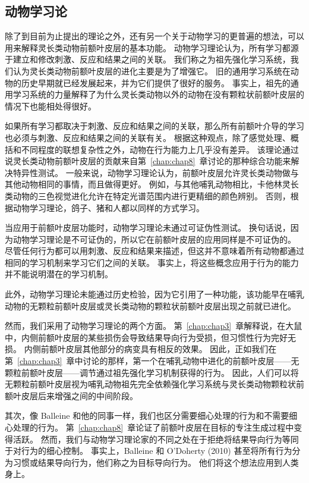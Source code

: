 \subsection{动物学习论}
除了到目前为止提出的理论之外，还有另一个关于动物学习的更普遍的想法，可以用来解释灵长类动物前额叶皮层的基本功能。 动物学习理论认为，所有学习都源于建立和修改刺激、反应和结果之间的关联。 我们称之为祖先强化学习系统，我们认为灵长类动物前额叶皮层的进化主要是为了增强它。 旧的通用学习系统在动物的历史早期就已经发展起来，并为它们提供了很好的服务。 事实上，祖先的通用学习系统的力量解释了为什么灵长类动物以外的动物在没有颗粒状前额叶皮层的情况下也能相处得很好。
\par 
如果所有学习都取决于刺激、反应和结果之间的关联，那么所有前额叶介导的学习也必须与刺激、反应和结果之间的关联有关。 根据这种观点，除了感觉处理、概括和不同程度的联想复杂性之外，动物在行为能力上几乎没有差异。 该理论通过说灵长类动物前额叶皮层的贡献来自第~\ref{chap:chap8}~章讨论的那种综合功能来解决特异性测试。 一般来说，动物学习理论认为，前额叶皮层允许灵长类动物做与其他动物相同的事情，而且做得更好。 例如，与其他哺乳动物相比，卡他林灵长类动物的三色视觉进化允许在特定光谱范围内进行更精细的颜色辨别。 否则，根据动物学习理论，鸽子、猪和人都以同样的方式学习。
\par 
当应用于前额叶皮层功能时，动物学习理论未通过可证伪性测试。 换句话说，因为动物学习理论是不可证伪的，所以它在前额叶皮层的应用同样是不可证伪的。 尽管任何行为都可以用刺激、反应和结果来描述，但这并不意味着所有动物都通过相同的学习机制来学习它们之间的关联。 事实上，将这些概念应用于行为的能力并不能说明潜在的学习机制。
\par 
此外，动物学习理论未能通过历史检验，因为它引用了一种功能，该功能早在哺乳动物的无颗粒前额叶皮层或灵长类动物的颗粒状前额叶皮层出现之前就已进化。
\par 
然而，我们采用了动物学习理论的两个方面。 第~\ref{chap:chap3}~章解释说，在大鼠中，内侧前额叶皮层的某些损伤会导致结果导向行为受损，但习惯性行为完好无损。 内侧前额叶皮层其他部分的病变具有相反的效果。 因此，正如我们在第~\ref{chap:chap3}~章中讨论的那样，第一个在哺乳动物中进化的前额叶皮层——无颗粒前额叶皮层——调节通过祖先强化学习机制获得的行为。 因此，人们可以将无颗粒前额叶皮层视为哺乳动物祖先完全依赖强化学习系统与灵长类动物颗粒状前额叶皮层后来增强之间的中间阶段。
\par 
其次，像 Balleine 和他的同事一样，我们也区分需要细心处理的行为和不需要细心处理的行为。 第~\ref{chap:chap8}~章论证了前额叶皮层在目标的专注生成过程中变得活跃。 然而，我们与动物学习理论家的不同之处在于拒绝将结果导向行为等同于对行为的细心控制。 事实上，Balleine 和 O’Doherty (2010) 甚至将所有行为分为习惯或结果导向行为，他们称之为目标导向行为。 他们将这个想法应用到人类身上。
